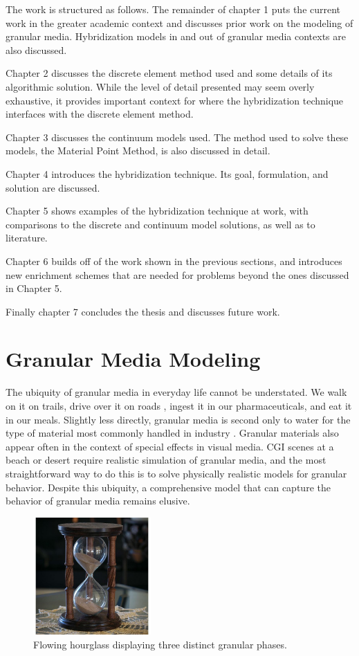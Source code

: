 The work is structured as follows. The remainder of chapter 1 puts the current work in the greater academic context and discusses prior work on the modeling of granular media. Hybridization models in and out of granular media contexts are also discussed. 

Chapter 2 discusses the discrete element method used and some details of its algorithmic solution. While the level of detail presented may seem overly exhaustive, it provides important context for where the hybridization technique interfaces with the discrete element method.

Chapter 3 discusses the continuum models used. The method used to solve these models, the Material Point Method, is also discussed in detail.

Chapter 4 introduces the hybridization technique. Its goal, formulation, and solution are discussed.

Chapter 5 shows examples of the hybridization technique at work, with comparisons to the discrete and continuum model solutions, as well as to literature.

Chapter 6 builds off of the work shown in the previous sections, and introduces new enrichment schemes that are needed for problems beyond the ones discussed in Chapter 5.

Finally chapter 7 concludes the thesis and discusses future work. 

\section{Granular Media Modeling}

The ubiquity of granular media in everyday life cannot be understated. We walk on it on trails, drive over it on roads \cite{sullivan06}, ingest it in our pharmaceuticals, and eat it in our meals. Slightly less directly, granular media is second only to water for the type of material most commonly handled in industry \cite{Richard:2005:Slow}. Granular materials also appear often in the context of special effects in visual media. CGI scenes at a beach or desert require realistic simulation of granular media, and the most straightforward way to do this is to solve physically realistic models for granular behavior. Despite this ubiquity, a comprehensive model that can capture the behavior of granular media remains elusive. 

\begin{figure}[htp] 
    \centering
        \includegraphics[width=0.4\textwidth]{figs/hourglass_whole.jpg}
    \caption{Flowing hourglass displaying three distinct granular phases.}
    \label{hourglass}
\end{figure}

